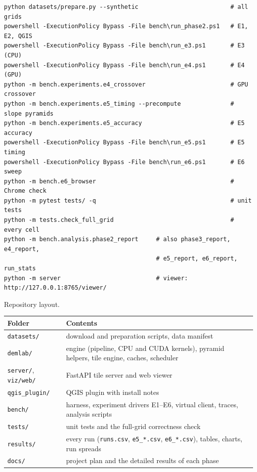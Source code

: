 \documentclass[11pt,a4paper]{article}
\begin{document}
\begin{footnotesize}
\begin{verbatim}
python datasets/prepare.py --synthetic                          # all grids
powershell -ExecutionPolicy Bypass -File bench\run_phase2.ps1   # E1, E2, QGIS
powershell -ExecutionPolicy Bypass -File bench\run_e3.ps1       # E3 (CPU)
powershell -ExecutionPolicy Bypass -File bench\run_e4.ps1       # E4 (GPU)
python -m bench.experiments.e4_crossover                        # GPU crossover
python -m bench.experiments.e5_timing --precompute              # slope pyramids
python -m bench.experiments.e5_accuracy                         # E5 accuracy
powershell -ExecutionPolicy Bypass -File bench\run_e5.ps1       # E5 timing
powershell -ExecutionPolicy Bypass -File bench\run_e6.ps1       # E6 sweep
python -m bench.e6_browser                                      # Chrome check
python -m pytest tests/ -q                                      # unit tests
python -m tests.check_full_grid                                 # every cell
python -m bench.analysis.phase2_report     # also phase3_report, e4_report,
                                           # e5_report, e6_report, run_stats
python -m server                           # viewer: http://127.0.0.1:8765/viewer/
\end{verbatim}
\end{footnotesize}

\begin{center}\begin{minipage}{\linewidth}\centering\small
\captionsetup{type=table}\caption{Repository layout.}
\label{tab:repo}
\begin{tabularx}{\linewidth}{>{\raggedright\arraybackslash}p{4.2cm}L}
\toprule
Folder & Contents \\
\midrule
\texttt{datasets/} & download and preparation scripts, data manifest \\
\texttt{demlab/} & engine (pipeline, CPU and CUDA kernels), pyramid helpers, tile engine, caches, scheduler \\
\texttt{server/}, \texttt{viz/web/} & FastAPI tile server and web viewer \\
\texttt{qgis\_plugin/} & QGIS plugin with install notes \\
\texttt{bench/} & harness, experiment drivers E1--E6, virtual client, traces, analysis scripts \\
\texttt{tests/} & unit tests and the full-grid correctness check \\
\texttt{results/} & every run (\texttt{runs.csv}, \texttt{e5\_*.csv}, \texttt{e6\_*.csv}), tables, charts, run spreads \\
\texttt{docs/} & project plan and the detailed results of each phase \\
\bottomrule
\end{tabularx}
\end{minipage}\end{center}
\end{document}
